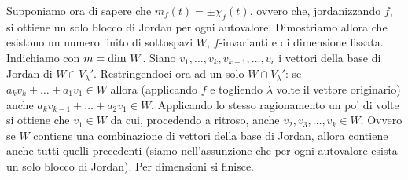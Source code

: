 \documentclass[a4paper,NoNotes,GeneralMath]{stdmdoc}
\begin{document}
\begin{itemize}
		Supponiamo ora di sapere che $m_f(t) = \pm \chi_f(t)$, ovvero che, jordanizzando $f$, si ottiene un solo blocco di Jordan per ogni autovalore. Dimostriamo allora che esistono un numero finito di sottospazi $W$, $f$-invarianti e di dimensione fissata. \\
		Indichiamo con $m = \mbox{dim } W$. Siano $v_1, \ldots, v_k, v_{k+1}, \ldots, v_{r}$ i vettori della base di Jordan di $W \cap V_{\lambda}'$. Restringendoci ora ad un solo $W \cap V_{\lambda}'$: se $a_kv_k+\ldots+a_1v_1 \in W$ allora (applicando $f$ e togliendo $\lambda$ volte il vettore originario) anche $a_kv_{k-1}+\ldots+a_2v_1 \in W$. Applicando lo stesso ragionamento un po' di volte si ottiene che $v_1 \in W$ da cui, procedendo a ritroso, anche $v_2, v_3, \ldots, v_k \in W$. Ovvero se $W$ contiene una combinazione di vettori della base di Jordan, allora contiene anche tutti quelli precedenti (siamo nell'assunzione che per ogni autovalore esista un solo blocco di Jordan). Per dimensioni si finisce.
	\end{itemize}
\end{document}
